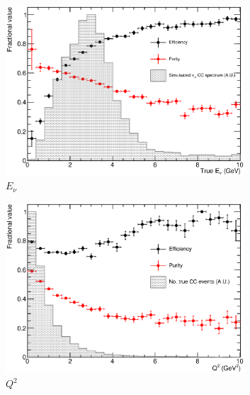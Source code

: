 \begin{figure}
  \centering
  \begin{subfigure}[t]{0.48\linewidth}
    \centering
    \includegraphics[width=0.98\textwidth]{ENuCutSelection.eps}
    \caption{$E_{\nu}$}
    \label{fig:ENuCutSelection}
  \end{subfigure}
  \hfill
  \begin{subfigure}[t]{0.48\linewidth}
    \centering
    \includegraphics[width=0.98\textwidth]{Q2CutSelection.eps}
    \caption{$Q^2$}
    \label{fig:Q2CutSelection}
  \end{subfigure}
  \vfill
  \begin{subfigure}[t]{0.48\linewidth}
    \centering

\end{subfigure}
\end{figure}
